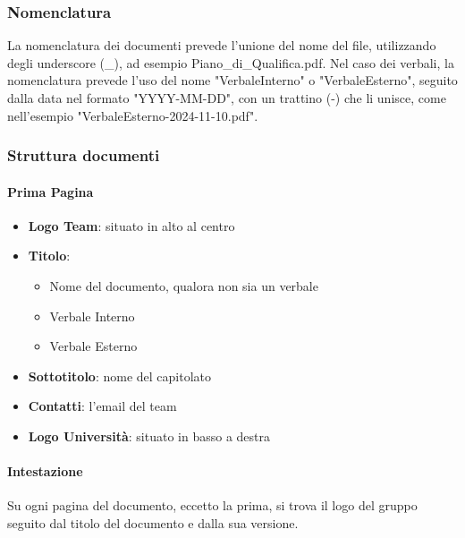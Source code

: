 \subsubsection{Nomenclatura}
La nomenclatura dei documenti prevede l'unione del nome del file, utilizzando degli underscore (\_), ad esempio Piano\_di\_Qualifica.pdf.
Nel caso dei verbali, la nomenclatura prevede l'uso del nome "VerbaleInterno" o "VerbaleEsterno", seguito dalla data nel formato "YYYY-MM-DD", con un trattino (-) che li unisce, come nell'esempio "VerbaleEsterno-2024-11-10.pdf".\\

\subsubsection{Struttura documenti}

    \paragraph{Prima Pagina}
    \begin{itemize}
    \item \textbf{Logo Team}: situato in alto al centro
    \item \textbf{Titolo}: \begin{itemize}
            \item Nome del documento, qualora non sia un verbale
            \item Verbale Interno
            \item Verbale Esterno
            \end{itemize}
    \item\textbf{Sottotitolo}: nome del capitolato
    \item\textbf{Contatti}: l'email del team
    \item\textbf{Logo Università}: situato in basso a destra
    \end{itemize}

    \paragraph{Intestazione}
    Su ogni pagina del documento, eccetto la prima, si trova il logo del gruppo seguito dal titolo del documento e dalla sua versione.\\

